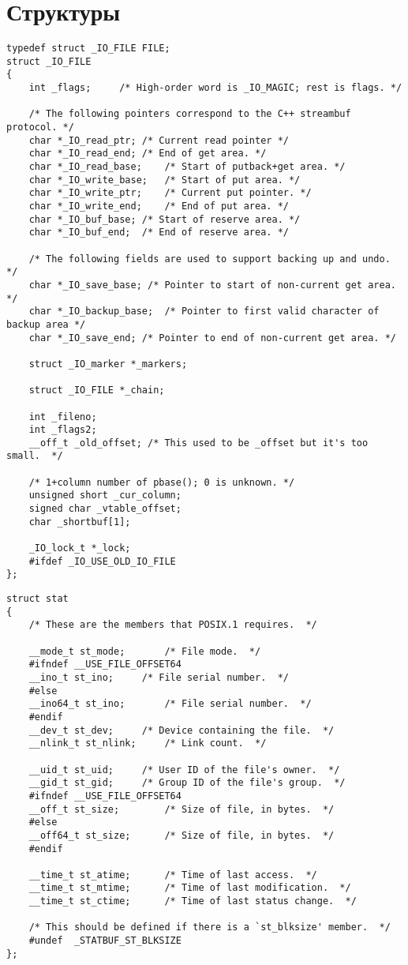 \section{Структуры}

\begin{lstlisting}[caption={Структура FILE}]
typedef struct _IO_FILE FILE;
struct _IO_FILE
{
	int _flags;		/* High-order word is _IO_MAGIC; rest is flags. */
	
	/* The following pointers correspond to the C++ streambuf protocol. */
	char *_IO_read_ptr;	/* Current read pointer */
	char *_IO_read_end;	/* End of get area. */
	char *_IO_read_base;	/* Start of putback+get area. */
	char *_IO_write_base;	/* Start of put area. */
	char *_IO_write_ptr;	/* Current put pointer. */
	char *_IO_write_end;	/* End of put area. */
	char *_IO_buf_base;	/* Start of reserve area. */
	char *_IO_buf_end;	/* End of reserve area. */
	
	/* The following fields are used to support backing up and undo. */
	char *_IO_save_base; /* Pointer to start of non-current get area. */
	char *_IO_backup_base;  /* Pointer to first valid character of backup area */
	char *_IO_save_end; /* Pointer to end of non-current get area. */
	
	struct _IO_marker *_markers;
	
	struct _IO_FILE *_chain;
	
	int _fileno;
	int _flags2;
	__off_t _old_offset; /* This used to be _offset but it's too small.  */
	
	/* 1+column number of pbase(); 0 is unknown. */
	unsigned short _cur_column;
	signed char _vtable_offset;
	char _shortbuf[1];
	
	_IO_lock_t *_lock;
	#ifdef _IO_USE_OLD_IO_FILE
};
\end{lstlisting}

\newpage

\begin{lstlisting}[caption={Структура stat}]
struct stat
{
	/* These are the members that POSIX.1 requires.  */
	
	__mode_t st_mode;		/* File mode.  */
	#ifndef __USE_FILE_OFFSET64
	__ino_t st_ino;		/* File serial number.  */
	#else
	__ino64_t st_ino;		/* File serial number.	*/
	#endif
	__dev_t st_dev;		/* Device containing the file.  */
	__nlink_t st_nlink;		/* Link count.  */
	
	__uid_t st_uid;		/* User ID of the file's owner.  */
	__gid_t st_gid;		/* Group ID of the file's group.  */
	#ifndef __USE_FILE_OFFSET64
	__off_t st_size;		/* Size of file, in bytes.  */
	#else
	__off64_t st_size;		/* Size of file, in bytes.  */
	#endif
	
	__time_t st_atime;		/* Time of last access.  */
	__time_t st_mtime;		/* Time of last modification.  */
	__time_t st_ctime;		/* Time of last status change.  */
	
	/* This should be defined if there is a `st_blksize' member.  */
	#undef	_STATBUF_ST_BLKSIZE
};
\end{lstlisting}